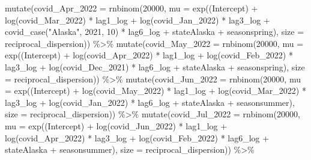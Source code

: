 \documentclass[
]{book}
\newenvironment{Shaded}{\begin{snugshade}}{\end{snugshade}}
\newcommand{\AttributeTok}[1]{\textcolor[rgb]{0.77,0.63,0.00}{#1}}
\newcommand{\DecValTok}[1]{\textcolor[rgb]{0.00,0.00,0.81}{#1}}
\newcommand{\FunctionTok}[1]{\textcolor[rgb]{0.00,0.00,0.00}{#1}}
\newcommand{\NormalTok}[1]{#1}
\newcommand{\SpecialCharTok}[1]{\textcolor[rgb]{0.00,0.00,0.00}{#1}}
\newcommand{\StringTok}[1]{\textcolor[rgb]{0.31,0.60,0.02}{#1}}
\begin{document}
\begin{Shaded}
\begin{Highlighting}[]
  \FunctionTok{mutate}\NormalTok{(}\AttributeTok{covid\_Apr\_2022 =} \FunctionTok{rnbinom}\NormalTok{(}\DecValTok{20000}\NormalTok{, }\AttributeTok{mu =} \FunctionTok{exp}\NormalTok{(}\StringTok{\textasciigrave{}}\AttributeTok{(Intercept)}\StringTok{\textasciigrave{}} \SpecialCharTok{+} \FunctionTok{log}\NormalTok{(covid\_Mar\_2022) }\SpecialCharTok{*}\NormalTok{ lag1\_log }\SpecialCharTok{+} \FunctionTok{log}\NormalTok{(covid\_Jan\_2022) }\SpecialCharTok{*}\NormalTok{ lag3\_log }\SpecialCharTok{+} \FunctionTok{covid\_case}\NormalTok{(}\StringTok{"Alaska"}\NormalTok{, }\DecValTok{2021}\NormalTok{, }\DecValTok{10}\NormalTok{) }\SpecialCharTok{*}\NormalTok{ lag6\_log }\SpecialCharTok{+}\NormalTok{ stateAlaska }\SpecialCharTok{+}\NormalTok{ seasonspring), }\AttributeTok{size =}\NormalTok{ reciprocal\_dispersion)) }\SpecialCharTok{\%\textgreater{}\%}
  \FunctionTok{mutate}\NormalTok{(}\AttributeTok{covid\_May\_2022 =} \FunctionTok{rnbinom}\NormalTok{(}\DecValTok{20000}\NormalTok{, }\AttributeTok{mu =} \FunctionTok{exp}\NormalTok{(}\StringTok{\textasciigrave{}}\AttributeTok{(Intercept)}\StringTok{\textasciigrave{}} \SpecialCharTok{+} \FunctionTok{log}\NormalTok{(covid\_Apr\_2022) }\SpecialCharTok{*}\NormalTok{ lag1\_log }\SpecialCharTok{+} \FunctionTok{log}\NormalTok{(covid\_Feb\_2022) }\SpecialCharTok{*}\NormalTok{ lag3\_log }\SpecialCharTok{+} \FunctionTok{log}\NormalTok{(covid\_Dec\_2021) }\SpecialCharTok{*}\NormalTok{ lag6\_log }\SpecialCharTok{+}\NormalTok{ stateAlaska }\SpecialCharTok{+}\NormalTok{ seasonspring), }\AttributeTok{size =}\NormalTok{ reciprocal\_dispersion)) }\SpecialCharTok{\%\textgreater{}\%}
  \FunctionTok{mutate}\NormalTok{(}\AttributeTok{covid\_Jun\_2022 =} \FunctionTok{rnbinom}\NormalTok{(}\DecValTok{20000}\NormalTok{, }\AttributeTok{mu =} \FunctionTok{exp}\NormalTok{(}\StringTok{\textasciigrave{}}\AttributeTok{(Intercept)}\StringTok{\textasciigrave{}} \SpecialCharTok{+} \FunctionTok{log}\NormalTok{(covid\_May\_2022) }\SpecialCharTok{*}\NormalTok{ lag1\_log }\SpecialCharTok{+} \FunctionTok{log}\NormalTok{(covid\_Mar\_2022) }\SpecialCharTok{*}\NormalTok{ lag3\_log }\SpecialCharTok{+} \FunctionTok{log}\NormalTok{(covid\_Jan\_2022) }\SpecialCharTok{*}\NormalTok{ lag6\_log }\SpecialCharTok{+}\NormalTok{ stateAlaska }\SpecialCharTok{+}\NormalTok{ seasonsummer), }\AttributeTok{size =}\NormalTok{ reciprocal\_dispersion)) }\SpecialCharTok{\%\textgreater{}\%}
  \FunctionTok{mutate}\NormalTok{(}\AttributeTok{covid\_Jul\_2022 =} \FunctionTok{rnbinom}\NormalTok{(}\DecValTok{20000}\NormalTok{, }\AttributeTok{mu =} \FunctionTok{exp}\NormalTok{(}\StringTok{\textasciigrave{}}\AttributeTok{(Intercept)}\StringTok{\textasciigrave{}} \SpecialCharTok{+} \FunctionTok{log}\NormalTok{(covid\_Jun\_2022) }\SpecialCharTok{*}\NormalTok{ lag1\_log }\SpecialCharTok{+} \FunctionTok{log}\NormalTok{(covid\_Apr\_2022) }\SpecialCharTok{*}\NormalTok{ lag3\_log }\SpecialCharTok{+} \FunctionTok{log}\NormalTok{(covid\_Feb\_2022) }\SpecialCharTok{*}\NormalTok{ lag6\_log }\SpecialCharTok{+}\NormalTok{ stateAlaska }\SpecialCharTok{+}\NormalTok{ seasonsummer), }\AttributeTok{size =}\NormalTok{ reciprocal\_dispersion))  }\SpecialCharTok{\%\textgreater{}\%}

\end{Highlighting}
\end{Shaded}
\end{document}
